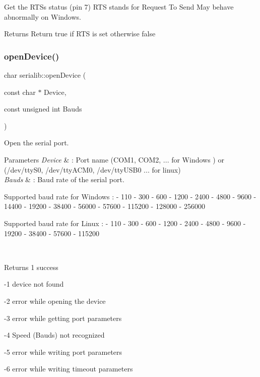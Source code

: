 Get the R\+TS\textquotesingle{}s status (pin 7) R\+TS stands for Request To Send May behave abnormally on Windows. 

\begin{DoxyReturn}{Returns}
Return true if R\+TS is set otherwise false 
\end{DoxyReturn}
\mbox{\label{classserialib_a5c2f95793e0fcd7fa6615682e8f58f16}} 
\subsubsection{\texorpdfstring{open\+Device()}{openDevice()}}
{\footnotesize\ttfamily char serialib\+::open\+Device (\begin{DoxyParamCaption}\item[{const char $\ast$}]{Device,  }\item[{const unsigned int}]{Bauds }\end{DoxyParamCaption})}



Open the serial port. 


\begin{DoxyParams}{Parameters}
{\em Device} & \+: Port name (C\+O\+M1, C\+O\+M2, ... for Windows ) or (/dev/tty\+S0, /dev/tty\+A\+C\+M0, /dev/tty\+U\+S\+B0 ... for linux) \\
\hline
{\em Bauds} & \+: Baud rate of the serial port. \begin{DoxyVerb}       \n Supported baud rate for Windows :
               - 110
               - 300
               - 600
               - 1200
               - 2400
               - 4800
               - 9600
               - 14400
               - 19200
               - 38400
               - 56000
               - 57600
               - 115200
               - 128000
               - 256000

      \n Supported baud rate for Linux :\n
               - 110
               - 300
               - 600
               - 1200
               - 2400
               - 4800
               - 9600
               - 19200
               - 38400
               - 57600
               - 115200
\end{DoxyVerb}
\\
\hline
\end{DoxyParams}
\begin{DoxyReturn}{Returns}
1 success 

-\/1 device not found 

-\/2 error while opening the device 

-\/3 error while getting port parameters 

-\/4 Speed (Bauds) not recognized 

-\/5 error while writing port parameters 

-\/6 error while writing timeout parameters 
\end{DoxyReturn}
\mbox{\label{classserialib_ab05e51ff3bc47c02d7d000d58b45a961}} 
